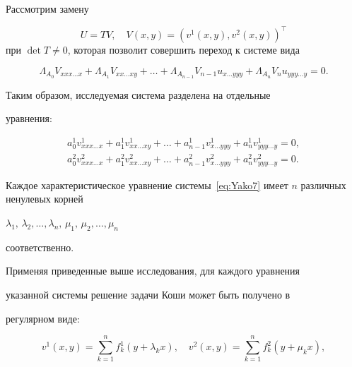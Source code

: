 Рассмотрим замену

$$U=TV,\quad V(x,y)=(v^{1}(x,y),v^{2}(x,y))^{\top}$$ при $\det T\neq

0$, которая позволит совершить переход к системе вида

\begin{equation}

\Lambda_{A_{0}}V_{xxx\ldots x}+\Lambda_{A_{1}}V_{xx\ldots xy}+\ldots+\Lambda_{A_{n-1}}V_{n-1}u_{x\ldots

yyy}+\Lambda_{A_{n}}V_{n}u_{yyy\ldots y}=0.\label{eq:Yako7}

\end{equation}



Таким образом, исследуемая система разделена на отдельные

уравнения:

$$

\begin{array}{l}

a_{0}^{1}v^{1}_{xxx\ldots x}+a_{1}^{1}v^{1}_{xx\ldots xy}+\ldots+a_{n-1}^{1}v^{1}_{x\ldots yyy}+a_{n}^{1}v^{1}_{yyy\ldots y}=0, \\[2mm]

a_{0}^{2}v^{2}_{xxx\ldots x}+a_{1}^{2}v^{2}_{xx\ldots

xy}+\ldots+a_{n-1}^{2}v^{2}_{x\ldots

yyy}+a_{n}^{2}v^{2}_{yyy\ldots y}=0.

\end{array} 

$$



Каждое характеристическое уравнение системы~\eqref{eq:Yako7} имеет $n$ различных ненулевых корней

$\lambda_{1},\,\lambda_{2},\ldots,\lambda_{n},\,\mu_{1},\,\mu_{2},\ldots,\mu_{n}$

соответственно.



Применяя приведенные выше исследования, для каждого уравнения

указанной системы  решение задачи Коши может быть получено в

регулярном виде:

$$

v^{1}(x,y)=\sum\limits_{k=1}^{n}f^{1}_{k}(y+\lambda_{k}x), \quad 

v^{2}(x,y)=\sum\limits_{k=1}^{n}f^{2}_{k}(y+\mu_{k}x),

$$

